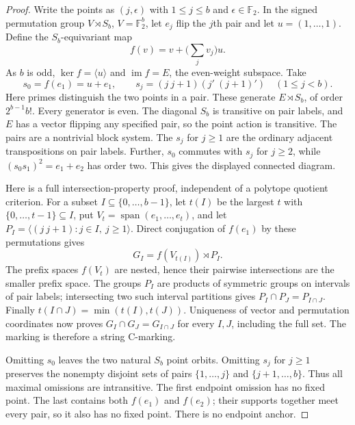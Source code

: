 \documentclass[11pt,a4paper]{article}
\newcommand{\gen}[1]{\langle#1\rangle}
\begin{document}
\begin{proof}
Write the points as $(j,\epsilon)$ with $1\leq j\leq b$ and
$\epsilon\in\mathbb F_2$. In the signed permutation group
$V\rtimes S_b$, $V=\mathbb F_2^b$, let $e_j$ flip the $j$th
pair and let $u=(1,\ldots,1)$. Define the $S_b$-equivariant map
\[
 f(v)=v+\Big(\sum_jv_j\Big)u.
\]
As $b$ is odd, $\ker f=\gen u$ and $\operatorname{im}f=E$,
the even-weight subspace. Take
\[
 s_0=f(e_1)=u+e_1,\qquad
 s_j=(j\ j+1)(j'\ (j+1)')\quad(1\leq j<b).
\]
Here primes distinguish the two points in a pair.
These generate $E\rtimes S_b$, of order $2^{b-1}b!$.
Every generator is even. The diagonal $S_b$ is transitive on
pair labels, and $E$ has a vector flipping any specified pair,
so the point action is transitive. The pairs are a nontrivial
block system. The $s_j$ for $j\geq1$ are the ordinary adjacent
transpositions on pair labels. Further, $s_0$ commutes with
$s_j$ for $j\geq2$, while $(s_0s_1)^2=e_1+e_2$ has order two.
This gives the displayed connected diagram.

Here is a full intersection-property proof, independent of a
polytope quotient criterion. For a subset $I\subseteq\{0,\ldots,b-1\}$,
let $t(I)$ be the largest $t$ with $\{0,\ldots,t-1\}\subseteq I$,
put $V_t=\operatorname{span}(e_1,\ldots,e_t)$, and let
$P_I=\gen{(j\ j+1):j\in I,\ j\geq1}$.
Direct conjugation of $f(e_1)$ by these permutations gives
\[
                     G_I=f(V_{t(I)})\rtimes P_I.
\]
The prefix spaces $f(V_t)$ are nested, hence their pairwise
intersections are the smaller prefix space. The groups $P_I$
are products of symmetric groups on intervals of pair labels;
intersecting two such interval partitions gives
$P_I\cap P_J=P_{I\cap J}$. Finally
$t(I\cap J)=\min(t(I),t(J))$. Uniqueness of vector and permutation
coordinates now proves $G_I\cap G_J=G_{I\cap J}$ for every
$I,J$, including the full set. The marking is therefore a
string C-marking.

Omitting $s_0$ leaves the two natural $S_b$ point orbits.
Omitting $s_j$ for $j\geq1$ preserves the nonempty disjoint
sets of pairs $\{1,\ldots,j\}$ and $\{j+1,\ldots,b\}$.
Thus all maximal omissions are intransitive. The first endpoint
omission has no fixed point. The last contains both $f(e_1)$
and $f(e_2)$; their supports together meet every pair, so it
also has no fixed point. There is no endpoint anchor.
\end{proof}
\end{document}
